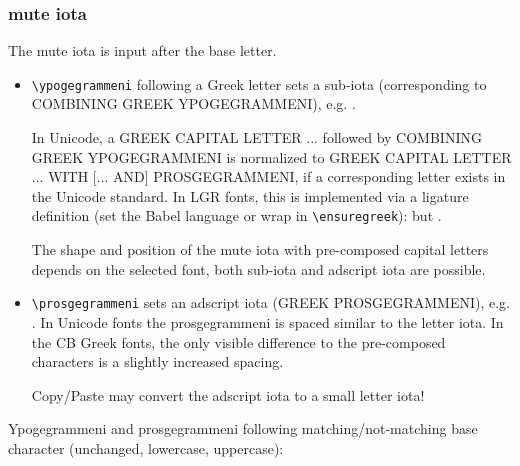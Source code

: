 \documentclass[a4paper]{article}
\begin{document}
\subsubsection{mute iota}

The mute iota is input after the base letter.

\begin{itemize}
\item \verb|\ypogegrammeni| following a Greek letter sets a sub-iota
  (corresponding to COMBINING GREEK YPOGEGRAMMENI),
  e.g. \ensuregreek{\textalpha\ypogegrammeni{}}.

  In Unicode, a GREEK CAPITAL LETTER ... followed by
  COMBINING GREEK YPOGEGRAMMENI is normalized to
  GREEK CAPITAL LETTER ... WITH [... AND] PROSGEGRAMMENI,
  if a corresponding letter exists in the Unicode standard.
  In LGR fonts, this is implemented via a ligature definition
  (set the Babel language or wrap in \verb|\ensuregreek|):
  \ensuregreek{\textAlpha\ypogegrammeni{}} but
  \ensuregreek{\textLambda\ypogegrammeni{}}.

  The shape and position of the mute iota with pre-composed capital letters
  depends on the selected font, both sub-iota and adscript iota are possible.

\item \verb|\prosgegrammeni| sets an adscript iota (GREEK PROSGEGRAMMENI),
  e.g. \textAlpha\prosgegrammeni{}.
  In Unicode fonts the prosgegrammeni is spaced similar to the letter iota.
  In the CB Greek fonts, the only visible difference to the pre-composed
  characters is a slightly increased spacing.

  Copy/Paste may convert the adscript iota to a small letter iota!

\end{itemize}
Ypogegrammeni and prosgegrammeni following matching/not-matching base character
(unchanged, lowercase, uppercase):
\begin{quote}
  \greekscript
  \textAlpha\ypogegrammeni \textAlpha\prosgegrammeni{}
  \MakeLowercase{\textAlpha\ypogegrammeni \textAlpha\prosgegrammeni}
  \MakeUppercase{\textAlpha\ypogegrammeni \textAlpha\prosgegrammeni}

  \textLambda\ypogegrammeni \textLambda\prosgegrammeni{}
  \MakeLowercase{\textLambda\ypogegrammeni \textLambda\prosgegrammeni}
  \MakeUppercase{\textLambda\ypogegrammeni \textLambda\prosgegrammeni}

  \textalpha\ypogegrammeni \textalpha\prosgegrammeni{}
  \MakeLowercase{\textalpha\ypogegrammeni \textalpha\prosgegrammeni}
  \MakeUppercase{\textalpha\ypogegrammeni \textalpha\prosgegrammeni}
\end{quote}
\end{document}
